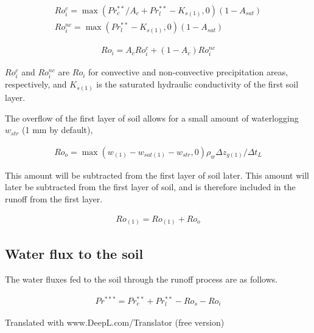 \begin{eqnarray}
 Ro_i^c = \max( Pr_c^{**}/A_c + Pr_l^{**} - K_{s(1)}, 0 ) (1 - A_{sat}) \\
 Ro_i^{nc} = \max( Pr_l^{**} - K_{s(1)}, 0 ) (1 - A_{sat})
\end{eqnarray}

\begin{eqnarray}
 Ro_i = A_c Ro_i^c + ( 1 - A_c ) Ro_i^{nc}
\end{eqnarray}

\(Ro_i^c\) and \(Ro_i^{nc}\) are \(Ro_i\) for convective and
non-convective precipitation areas, respectively, and \(K_{s(1)}\) is
the saturated hydraulic conductivity of the first soil layer.

The overflow of the first layer of soil allows for a small amount of
waterlogging \(w_{str}\) (1 mm by default),

\begin{eqnarray}
 Ro_o = \max(w_{(1)} - w_{sat(1)} - w_{str}, 0) \rho_w \Delta z_{g(1)} / \Delta t_L
\end{eqnarray}

This amount will be subtracted from the first layer of soil later. This
amount will later be subtracted from the first layer of soil, and is
therefore included in the runoff from the first layer.

\begin{eqnarray}
 Ro_{(1)} = Ro_{(1)} + Ro_o
\end{eqnarray}

\hypertarget{water-flux-to-the-soil}{%
\subsection{Water flux to the soil}\label{water-flux-to-the-soil}}

The water fluxes fed to the soil through the runoff process are as
follows.

\begin{eqnarray}
 Pr^{***} = Pr^{**}_c + Pr^{**}_l - Ro_s - Ro_i
\end{eqnarray}

Translated with www.DeepL.com/Translator (free version)
